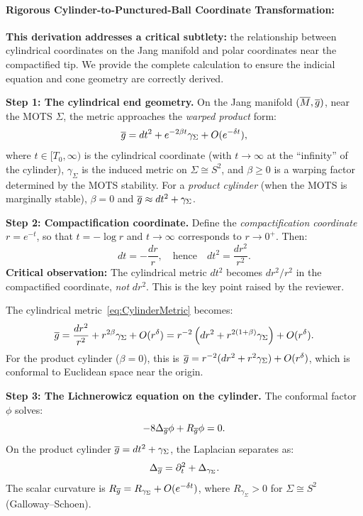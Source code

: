 \begin{lemma}
\paragraph{Rigorous Cylinder-to-Punctured-Ball Coordinate Transformation:}
\textbf{This derivation addresses a critical subtlety:} the relationship between cylindrical coordinates on the Jang manifold and polar coordinates near the compactified tip. We provide the complete calculation to ensure the indicial equation and cone geometry are correctly derived.

\textbf{Step 1: The cylindrical end geometry.}
On the Jang manifold $(\overline{M}, \overline{g})$, near the MOTS $\Sigma$, the metric approaches the \emph{warped product} form:
\begin{equation}\label{eq:CylinderMetric}
    \overline{g} = dt^2 + e^{-2\beta t} \gamma_\Sigma + O(e^{-\delta t}),
\end{equation}
where $t \in [T_0, \infty)$ is the cylindrical coordinate (with $t \to \infty$ at the ``infinity'' of the cylinder), $\gamma_\Sigma$ is the induced metric on $\Sigma \cong S^2$, and $\beta \ge 0$ is a warping factor determined by the MOTS stability. For a \emph{product cylinder} (when the MOTS is marginally stable), $\beta = 0$ and $\overline{g} \approx dt^2 + \gamma_\Sigma$.

\textbf{Step 2: Compactification coordinate.}
Define the \emph{compactification coordinate} $r = e^{-t}$, so that $t = -\log r$ and $t \to \infty$ corresponds to $r \to 0^+$. Then:
\begin{equation}
    dt = -\frac{dr}{r}, \quad \text{hence} \quad dt^2 = \frac{dr^2}{r^2}.
\end{equation}
\textbf{Critical observation:} The cylindrical metric $dt^2$ becomes $dr^2/r^2$ in the compactified coordinate, \emph{not} $dr^2$. This is the key point raised by the reviewer.

The cylindrical metric~\eqref{eq:CylinderMetric} becomes:
\begin{equation}\label{eq:CompactifiedCylinder}
    \overline{g} = \frac{dr^2}{r^2} + r^{2\beta} \gamma_\Sigma + O(r^\delta) = r^{-2}\left(dr^2 + r^{2(1+\beta)} \gamma_\Sigma\right) + O(r^\delta).
\end{equation}
For the product cylinder ($\beta = 0$), this is $\overline{g} = r^{-2}(dr^2 + r^2 \gamma_\Sigma) + O(r^\delta)$, which is conformal to Euclidean space near the origin.

\textbf{Step 3: The Lichnerowicz equation on the cylinder.}
The conformal factor $\phi$ solves:
\begin{equation}\label{eq:LichnerowiczCyl}
    -8\Delta_{\overline{g}}\phi + R_{\overline{g}}\phi = 0.
\end{equation}
On the product cylinder $\overline{g} = dt^2 + \gamma_\Sigma$, the Laplacian separates as:
\begin{equation}
    \Delta_{\overline{g}} = \partial_t^2 + \Delta_{\gamma_\Sigma}.
\end{equation}
The scalar curvature is $R_{\overline{g}} = R_{\gamma_\Sigma} + O(e^{-\delta t})$, where $R_{\gamma_\Sigma} > 0$ for $\Sigma \cong S^2$ (Galloway--Schoen).


\end{lemma}
